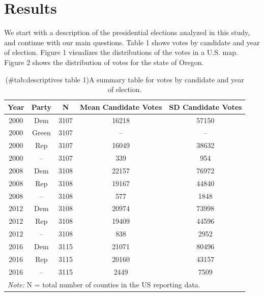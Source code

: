 \documentclass[
  english,
  man]{apa6}
\begin{document}
\hypertarget{results}{%
\section{Results}\label{results}}

We start with a description of the presidential elections analyzed in this study, and continue with our main questions. Table 1 shows votes by candidate and year of election. Figure 1 visualizes the distributions of the votes in a U.S. map. Figure 2 shows the distribution of votes for the state of Oregon.

\begin{table}

\caption{(\#tab:descriptives table 1)A summary table for votes by candidate and year of election.}
\centering
\begin{tabular}[t]{c|c|c|c|c}
\hline
Year & Party & N & Mean Candidate Votes & SD Candidate Votes\\
\hline
2000 & Dem & 3107 & 16218 & 57150\\
\hline
2000 & Green & 3107 & -- & --\\
\hline
2000 & Rep & 3107 & 16049 & 38632\\
\hline
2000 & -- & 3107 & 339 & 954\\
\hline
2008 & Dem & 3108 & 22157 & 76972\\
\hline
2008 & Rep & 3108 & 19167 & 44840\\
\hline
2008 & -- & 3108 & 577 & 1848\\
\hline
2012 & Dem & 3108 & 20974 & 73998\\
\hline
2012 & Rep & 3108 & 19409 & 44596\\
\hline
2012 & -- & 3108 & 838 & 2952\\
\hline
2016 & Dem & 3115 & 21071 & 80496\\
\hline
2016 & Rep & 3115 & 20160 & 43157\\
\hline
2016 & -- & 3115 & 2449 & 7509\\
\hline
\multicolumn{5}{l}{\rule{0pt}{1em}\textit{Note: } N = total number of counties in the US reporting data.}\\
\end{tabular}
\end{table}
\end{document}
